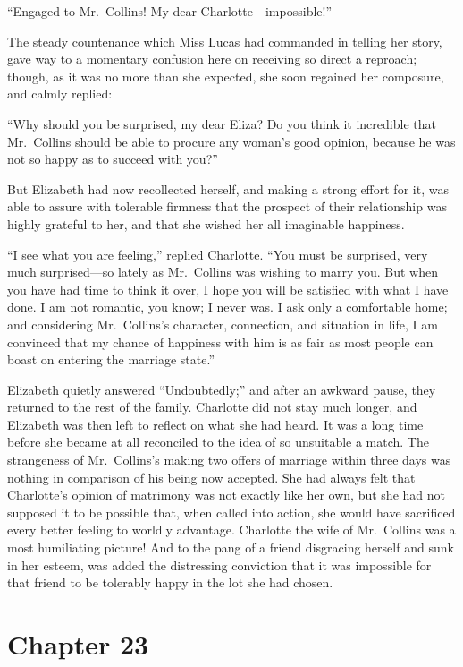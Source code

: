 ``Engaged to Mr.\ Collins!  My dear Charlotte---impossible!''

The steady countenance which Miss Lucas had commanded in
telling her story, gave way to a momentary confusion here on
receiving so direct a reproach; though, as it was no more than
she expected, she soon regained her composure, and calmly
replied:

``Why should you be surprised, my dear Eliza?  Do you think it
incredible that Mr.\ Collins should be able to procure any
woman's good opinion, because he was not so happy as to
succeed with you?''

But Elizabeth had now recollected herself, and making a strong
effort for it, was able to assure with tolerable firmness that the
prospect of their relationship was highly grateful to her, and
that she wished her all imaginable happiness.

``I see what you are feeling,'' replied Charlotte.  ``You must be
surprised, very much surprised---so lately as Mr.\ Collins was
wishing to marry you.  But when you have had time to think it
over, I hope you will be satisfied with what I have done.  I am
not romantic, you know; I never was.  I ask only a comfortable
home; and considering Mr.\ Collins's character, connection, and
situation in life, I am convinced that my chance of happiness
with him is as fair as most people can boast on entering the
marriage state.''

Elizabeth quietly answered ``Undoubtedly;'' and after an
awkward pause, they returned to the rest of the family.
Charlotte did not stay much longer, and Elizabeth was then left
to reflect on what she had heard.  It was a long time before she
became at all reconciled to the idea of so unsuitable a match.
The strangeness of Mr.\ Collins's making two offers of marriage
within three days was nothing in comparison of his being now
accepted.  She had always felt that Charlotte's opinion of
matrimony was not exactly like her own, but she had not
supposed it to be possible that, when called into action, she
would have sacrificed every better feeling to worldly advantage.
Charlotte the wife of Mr.\ Collins was a most humiliating picture!
And to the pang of a friend disgracing herself and sunk in her
esteem, was added the distressing conviction that it was
impossible for that friend to be tolerably happy in the lot
she had chosen.



\chapter{Chapter 23}


